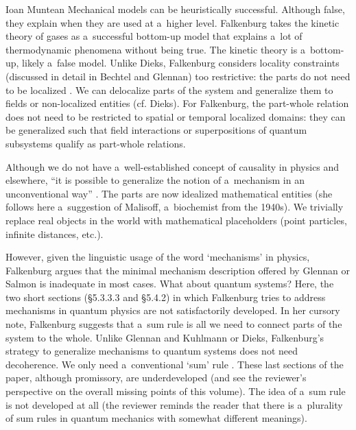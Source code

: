 \begin{recengenv}{Ioan Muntean}
Mechanical models can be heuristically successful. Although false, they explain when they are used at a~higher level. Falkenburg takes the kinetic theory of gases as a~successful bottom-up model that explains a~lot of thermodynamic phenomena without being true. The kinetic theory is a~bottom-up, likely a~false model. Unlike Dieks, Falkenburg considers locality constraints (discussed in detail in Bechtel and Glennan) too restrictive: the parts do not need to be localized
\parencite*[][p.81]{falkenburg_mechanistic_2019}. %
 We can delocalize parts of the system and generalize them to fields or non-localized entities (cf. Dieks). For Falkenburg, the part-whole relation does not need to be restricted to spatial or temporal localized domains: they can be generalized such that field interactions or superpositions of quantum subsystems qualify as part-whole relations.

Although we do not have a~well-established concept of causality in physics and elsewhere, ``it is possible to generalize the notion of a~mechanism in an unconventional way''
\parencite*[][p.82]{falkenburg_mechanistic_2019}. %
 The parts are now idealized mathematical entities (she follows here a~suggestion of Malisoff, a~biochemist from the 1940s). We trivially replace real objects in the world with mathematical placeholders (point particles, infinite distances, etc.).

However, given the linguistic usage of the word ‘mechanisms' in physics, Falkenburg argues that the minimal mechanism description offered by Glennan or Salmon is inadequate in most cases. What about quantum systems? Here, the two short sections (§5.3.3.3 and §5.4.2) in which Falkenburg tries to address mechanisms in quantum physics are not satisfactorily developed. In her cursory note, Falkenburg suggests that a~sum rule is all we need to connect parts of the system to the whole. Unlike Glennan and Kuhlmann or Dieks, Falkenburg's strategy to generalize mechanisms to quantum systems does not need decoherence. We only need a~conventional ‘sum' rule
\parencite*[][p.83]{falkenburg_mechanistic_2019}. %
 These last sections of the paper, although promissory, are underdeveloped (and see the reviewer's perspective on the overall missing points of this volume). The idea of a~sum rule is not developed at all (the reviewer reminds the reader that there is a~plurality of sum rules in quantum mechanics with somewhat different meanings).


\end{recengenv}
